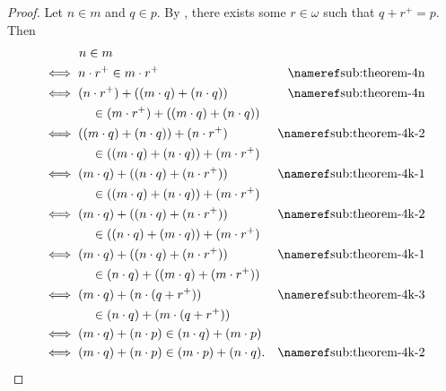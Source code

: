 \documentclass{report}
\begin{document}
  \begin{proof}

    Let $n \in m$ and $q \in p$.
    By , there exists some $r \in \omega$ such that
      $q + r^+ = p$.
    Then
      \begin{align*}
        & \qquad\quad n \in m \\
        & \iff n \cdot r^+ \in m \cdot r^+ & \textref{sub:theorem-4n} \\
        & \iff (n \cdot r^+) + ((m \cdot q) + (n \cdot q))
          & \textref{sub:theorem-4n} \\
          & \qquad\qquad \in (m \cdot r^+) + ((m \cdot q) + (n \cdot q)) \\
        & \iff ((m \cdot q) + (n \cdot q)) + (n \cdot r^+)
          & \textref{sub:theorem-4k-2} \\
          & \qquad\qquad \in ((m \cdot q) + (n \cdot q)) + (m \cdot r^+) \\
        & \iff (m \cdot q) + ((n \cdot q) + (n \cdot r^+))
          & \textref{sub:theorem-4k-1} \\
          & \qquad\qquad \in ((m \cdot q) + (n \cdot q)) + (m \cdot r^+) \\
        & \iff (m \cdot q) + ((n \cdot q) + (n \cdot r^+))
          & \textref{sub:theorem-4k-2} \\
          & \qquad\qquad \in ((n \cdot q) + (m \cdot q)) + (m \cdot r^+) \\
        & \iff (m \cdot q) + ((n \cdot q) + (n \cdot r^+))
          & \textref{sub:theorem-4k-1} \\
          & \qquad\qquad \in (n \cdot q) + ((m \cdot q) + (m \cdot r^+)) \\
        & \iff (m \cdot q) + (n \cdot (q + r^+))
          & \textref{sub:theorem-4k-3} \\
          & \qquad\qquad \in (n \cdot q) + (m \cdot (q + r^+)) \\
        & \iff (m \cdot q) + (n \cdot p) \in (n \cdot q) + (m \cdot p) \\
        & \iff (m \cdot q) + (n \cdot p) \in (m \cdot p) + (n \cdot q).
          & \textref{sub:theorem-4k-2}
      \end{align*}

  \end{proof}

\subsection{}%
\end{document}
